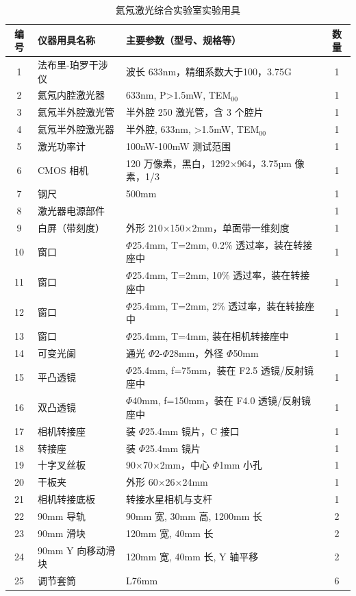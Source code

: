 \begin{table}[htbp]
	\centering
	\caption{氦氖激光综合实验室实验用具}
	\label{tab:Instruments}
	\begin{tabular}{|c|m{6cm}|m{8cm}|c|}
		\hline
		\textbf{编号} & \textbf{仪器用具名称} & \textbf{主要参数（型号、规格等）} & \textbf{数量} \\ \hline
		1 & 法布里-珀罗干涉仪 & 波长 633nm，精细系数大于100，3.75G & 1 \\ \hline
		2 & 氦氖内腔激光器 & 633nm, P>1.5mW, TEM$_{00}$ & 1 \\ \hline
		3 & 氦氖半外腔激光管 & 半外腔 250 激光管，含 3 个腔片 & 1 \\ \hline
		4 & 氦氖半外腔激光器 & 半外腔, 633nm, >1.5mW, TEM$_{00}$ & 1 \\ \hline
		5 & 激光功率计 & 100nW-100mW 测试范围 & 1 \\ \hline
		6 & CMOS 相机 & 120 万像素，黑白，1292×964，3.75µm 像素，1/3 & 1 \\ \hline
		7 & 钢尺 & 500mm & 1 \\ \hline
		8 & 激光器电源部件 & & 1 \\ \hline
		9 & 白屏（带刻度） & 外形 210×150×2mm，单面带一维刻度 & 1 \\ \hline
		10 & 窗口 & $\Phi$25.4mm, T=2mm, 0.2\% 透过率，装在转接座中 & 1 \\ \hline
		11 & 窗口 & $\Phi$25.4mm, T=2mm, 10\% 透过率，装在转接座中 & 1 \\ \hline
		12 & 窗口 & $\Phi$25.4mm, T=2mm, 2\% 透过率，装在转接座中 & 1 \\ \hline
		13 & 窗口 & $\Phi$25.4mm, T=4mm, 装在相机转接座中 & 1 \\ \hline
		14 & 可变光阑 & 通光 $\Phi$2-$\Phi$28mm，外径 $\Phi$50mm & 1 \\ \hline
		15 & 平凸透镜 & $\Phi$25.4mm, f=75mm，装在 F2.5 透镜/反射镜座中 & 1 \\ \hline
		16 & 双凸透镜 & $\Phi$40mm, f=150mm，装在 F4.0 透镜/反射镜座中 & 1 \\ \hline
		17 & 相机转接座 & 装 $\Phi$25.4mm 镜片，C 接口 & 1 \\ \hline
		18 & 转接座 & 装 $\Phi$25.4mm 镜片 & 1 \\ \hline
		19 & 十字叉丝板 & 90×70×2mm，中心 $\Phi$1mm 小孔 & 1 \\ \hline
		20 & 干板夹 & 外形 60×26×24mm & 1 \\ \hline
		21 & 相机转接底板 & 转接水星相机与支杆 & 1 \\ \hline
		22 & 90mm 导轨 & 90mm 宽, 30mm 高, 1200mm 长 & 2 \\ \hline
		23 & 90mm 滑块 & 120mm 宽, 40mm 长 & 2 \\ \hline
		24 & 90mm Y 向移动滑块 & 120mm 宽, 40mm 长, Y 轴平移 & 2 \\ \hline
		25 & 调节套筒 & L76mm & 6 \\ \hline
	\end{tabular}
\end{table}



